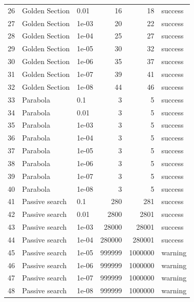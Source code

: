 \begin{longtable}{rllrrl}
26 & Golden Section & 0.01 & 16 & 18 & success \\
27 & Golden Section & 1e-03 & 20 & 22 & success \\
28 & Golden Section & 1e-04 & 25 & 27 & success \\
29 & Golden Section & 1e-05 & 30 & 32 & success \\
30 & Golden Section & 1e-06 & 35 & 37 & success \\
31 & Golden Section & 1e-07 & 39 & 41 & success \\
32 & Golden Section & 1e-08 & 44 & 46 & success \\
33 & Parabola & 0.1 & 3 & 5 & success \\
34 & Parabola & 0.01 & 3 & 5 & success \\
35 & Parabola & 1e-03 & 3 & 5 & success \\
36 & Parabola & 1e-04 & 3 & 5 & success \\
37 & Parabola & 1e-05 & 3 & 5 & success \\
38 & Parabola & 1e-06 & 3 & 5 & success \\
39 & Parabola & 1e-07 & 3 & 5 & success \\
40 & Parabola & 1e-08 & 3 & 5 & success \\
41 & Passive search & 0.1 & 280 & 281 & success \\
42 & Passive search & 0.01 & 2800 & 2801 & success \\
43 & Passive search & 1e-03 & 28000 & 28001 & success \\
44 & Passive search & 1e-04 & 280000 & 280001 & success \\
45 & Passive search & 1e-05 & 999999 & 1000000 & warning \\
46 & Passive search & 1e-06 & 999999 & 1000000 & warning \\
47 & Passive search & 1e-07 & 999999 & 1000000 & warning \\
48 & Passive search & 1e-08 & 999999 & 1000000 & warning \\
\end{longtable}
